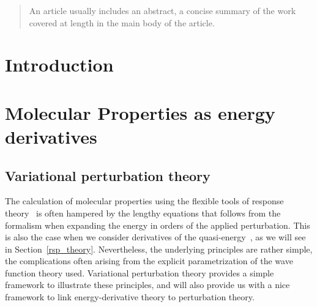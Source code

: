 \documentclass[%
 reprint,
 amsmath,amssymb,
 aps,
]{revtex4-1}
\begin{document}
\begin{abstract}
An article usually includes an abstract, a concise summary of the work
covered at length in the main body of the article. 
\end{abstract}

\maketitle


\section{\label{sec:intro}Introduction}



\section{\label{sec:MolProp}Molecular Properties as energy derivatives}

\subsection{Variational perturbation theory}

The calculation of molecular properties using the flexible tools of
response theory~\cite{} is often hampered by the lengthy equations that
follows from the formalism when expanding the energy in orders of the
applied perturbation. This is also the case when we consider
derivatives of the quasi-energy~\cite{}, as we will see in
Section~\ref{rsp_theory}. Nevertheless, the underlying principles are
rather simple, the complications often arising from the explicit
parametrization of the wave function theory used. Variational
perturbation theory provides a simple framework to illustrate these
principles, and will also provide us with a nice framework to link
energy-derivative theory  to perturbation theory. 
\end{document}

